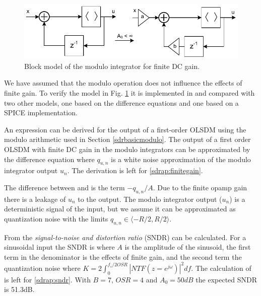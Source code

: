 \begin{figure}[htbp]
\centerline{ \includegraphics[width=\myfigwidth]{graphics/modint_beh}}
  \caption{ Block model of the modulo integrator for finite DC gain.}
  \label{sdrfig:modint_beh}
\end{figure}

We have assumed that the modulo operation does not influence the
effects of finite gain. To verify the model in
Fig. \ref{sdrfig:modint_beh}  it is implemented in \simulink \cite{simulink} and compared
with two other models, one based on the difference equations
and one based on a SPICE implementation.

An expression can be
derived for the output of a first-order OLSDM using the modulo
arithmetic used in Section \ref{sdrbasicmodulo}. The output of a first
order OLSDM with finite DC gain in the modulo integrators can be
approximated by the difference equation
where $q_{u,n}$ is a white noise approximation of the modulo
integrator output $u_{n}$. The derivation is left for \myappname
\ref{sdrap:finitegain}. 

The
difference between  and  is the term $-q_{u,n}/A$. Due to the finite
opamp gain  there is a leakage of $u_n$ to the
output. The modulo integrator output ($u_n$) is a deterministic signal of the input, but we assume it
can be approximated as quantization noise with the limits $q_{u,n} \in
\langle -R/2, R/2 \rangle$. 


From  the \textit{signal-to-noise 
and distortion ratio} (SNDR) can be
calculated. For a sinusoidal input the SNDR is
where $A$ is the amplitude of the sinusoid, the first term in the
denominator is the effects of finite gain, and the second term the
quantization noise where $K = 2
\int_0^{f_s/2OSR}{|NTF(z=e^{j\omega})|^2}df$. The calculation of
 is left for \myappname \ref{sdrap:sndr}. With $B=7$, $OSR=4$
and $A_0=50dB$ the expected SNDR is 51.3dB. 


